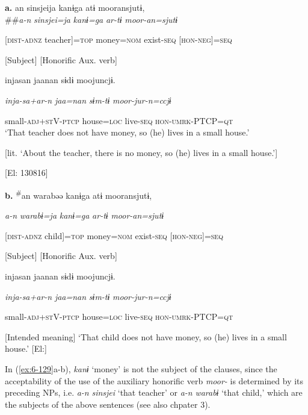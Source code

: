 \begin{table}
\begin{styleBeschriftung}
\ea\label{ex:6-129}
 \textbf{a.}  {\TM}  an  sinsjeija  kanɨga  atɨ  mooransjutɨ,\\##\textit{a-n}  \textit{sinsjei=ja}  \textit{kanɨ=ga}  \textit{ar-tɨ}  \textit{moor-an=sjutɨ}

      [\textsc{dist}-\textsc{adnz}  teacher]=\textsc{top}  money=\textsc{nom}  exist-\textsc{seq}  [\textsc{hon}-\textsc{neg}]=\textsc{seq}

      [Subject]      [Honorific Aux. verb]

      injasan  jaanan  sɨdɨ  moojuncjɨ.

      \textit{inja-sa+ar-n}  \textit{jaa=nan}  \textit{sɨm-tɨ}  \textit{moor-jur-n=ccjɨ}

      small-\textsc{adj}+\textsc{st}V-\textsc{ptcp}  house=\textsc{loc}  live-\textsc{seq}  \textsc{hon}-\textsc{umrk}-PTCP=\textsc{qt}\\
\glt ‘That teacher does not have money, so (he) lives in a small house.’

[lit. ‘About the teacher, there is no money, so (he) lives in a small house.’]

      [El: 130816]

  \textbf{b.}  {\TM}  \textsuperscript{\#}an  warabəə  kanɨga  atɨ  mooransjutɨ,

      \textit{a-n}  \textit{warabɨ=ja}  \textit{kanɨ=ga}  \textit{ar-tɨ}  \textit{moor-an=sjutɨ}

      [\textsc{dist}-\textsc{adnz}  child]=\textsc{top}  money=\textsc{nom}  exist-\textsc{seq}  [\textsc{hon}-\textsc{neg}]=\textsc{seq}

      [Subject]      [Honorific Aux. verb]

      injasan  jaanan  sɨdɨ  moojuncjɨ.

      \textit{inja-sa+ar-n}  \textit{jaa=nan}  \textit{sɨm-tɨ}  \textit{moor-jur-n=ccjɨ}

      small-\textsc{adj}+\textsc{st}V-\textsc{ptcp}  house=\textsc{loc}  live-\textsc{seq}  \textsc{hon}-\textsc{umrk}-PTCP=\textsc{qt}

      [Intended meaning] ‘That child does not have money, so (he) lives in a small house.’ [El:]

In (\ref{ex:6-129}a-b), \textit{kanɨ} ‘money’ is not the subject of the clauses, since the acceptability of the use of the auxiliary honorific verb \textit{moor-} is determined by its preceding NPs, i.e. \textit{a-n} \textit{sinsjei} ‘that teacher’ or \textit{a-n} \textit{warabɨ} ‘that child,’ which are the subjects of the above sentences (see also chpater 3).


\end{styleBeschriftung}
\end{table}
